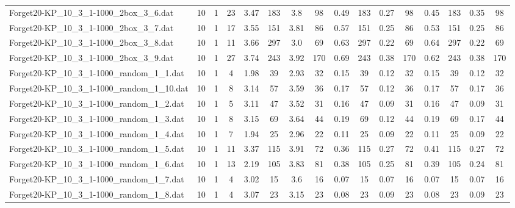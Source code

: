 \begin{sidewaystable}[!ht]
{\begin{tabular}{lccccccccccccccc}
Forget20-KP\_10\_3\_1-1000\_2box\_3\_6.dat & 10 & 1 & 23 & 3.47 & 183 & 3.8 & 98 & 0.49 & 183 & 0.27 & 98 & 0.45 & 183 & 0.35 & 98 \\
Forget20-KP\_10\_3\_1-1000\_2box\_3\_7.dat & 10 & 1 & 17 & 3.55 & 151 & 3.81 & 86 & 0.57 & 151 &  \textcolor{blue2}{0.25} & 86 & 0.53 & 151 &  \textcolor{blue2}{0.25} & 86 \\
Forget20-KP\_10\_3\_1-1000\_2box\_3\_8.dat & 10 & 1 & 11 & 3.66 & 297 & 3.0 & 69 & 0.63 & 297 &  \textcolor{blue2}{0.22} & 69 & 0.64 & 297 &  \textcolor{blue2}{0.22} & 69 \\
Forget20-KP\_10\_3\_1-1000\_2box\_3\_9.dat & 10 & 1 & 27 & 3.74 & 243 & 3.92 & 170 & 0.69 & 243 &  \textcolor{blue2}{0.38} & 170 & 0.62 & 243 &  \textcolor{blue2}{0.38} & 170 \\
Forget20-KP\_10\_3\_1-1000\_random\_1\_1.dat & 10 & 1 & 4 & 1.98 & 39 & 2.93 & 32 & 0.15 & 39 &  \textcolor{blue2}{0.12} & 32 & 0.15 & 39 &  \textcolor{blue2}{0.12} & 32 \\
Forget20-KP\_10\_3\_1-1000\_random\_1\_10.dat & 10 & 1 & 8 & 3.14 & 57 & 3.59 & 36 & 0.17 & 57 &  \textcolor{blue2}{0.12} & 36 & 0.17 & 57 & 0.17 & 36 \\
Forget20-KP\_10\_3\_1-1000\_random\_1\_2.dat & 10 & 1 & 5 & 3.11 & 47 & 3.52 & 31 & 0.16 & 47 &  \textcolor{blue2}{0.09} & 31 & 0.16 & 47 &  \textcolor{blue2}{0.09} & 31 \\
Forget20-KP\_10\_3\_1-1000\_random\_1\_3.dat & 10 & 1 & 8 & 3.15 & 69 & 3.64 & 44 & 0.19 & 69 &  \textcolor{blue2}{0.12} & 44 & 0.19 & 69 & 0.17 & 44 \\
Forget20-KP\_10\_3\_1-1000\_random\_1\_4.dat & 10 & 1 & 7 & 1.94 & 25 & 2.96 & 22 & 0.11 & 25 &  \textcolor{blue2}{0.09} & 22 & 0.11 & 25 &  \textcolor{blue2}{0.09} & 22 \\
Forget20-KP\_10\_3\_1-1000\_random\_1\_5.dat & 10 & 1 & 11 & 3.37 & 115 & 3.91 & 72 & 0.36 & 115 &  \textcolor{blue2}{0.27} & 72 & 0.41 & 115 &  \textcolor{blue2}{0.27} & 72 \\
Forget20-KP\_10\_3\_1-1000\_random\_1\_6.dat & 10 & 1 & 13 & 2.19 & 105 & 3.83 & 81 & 0.38 & 105 & 0.25 & 81 & 0.39 & 105 &  \textcolor{blue2}{0.24} & 81 \\
Forget20-KP\_10\_3\_1-1000\_random\_1\_7.dat & 10 & 1 & 4 & 3.02 & 15 & 3.6 & 16 &  \textcolor{blue2}{0.07} & 15 &  \textcolor{blue2}{0.07} & 16 &  \textcolor{blue2}{0.07} & 15 &  \textcolor{blue2}{0.07} & 16 \\
Forget20-KP\_10\_3\_1-1000\_random\_1\_8.dat & 10 & 1 & 4 & 3.07 & 23 & 3.15 & 23 &  \textcolor{blue2}{0.08} & 23 & 0.09 & 23 &  \textcolor{blue2}{0.08} & 23 & 0.09 & 23 \\

\end{tabular}}
\end{sidewaystable}
